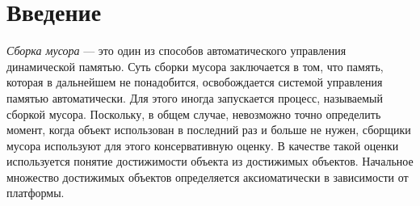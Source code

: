 \documentclass[12pt,a4paper]{article}
\renewcommand\baselinestretch{1.5}
\begin{document}


\tableofcontents    

\newpage
\section*{Введение}
\textit{Сборка мусора} — это один из способов автоматического управления динамической памятью.
Суть сборки мусора заключается в том, что память, которая в дальнейшем не понадобится, освобождается системой управления памятью автоматически. 
Для этого иногда запускается процесс, называемый сборкой  мусора.
Поскольку, в общем случае, невозможно точно определить момент, когда объект использован в последний раз и
больше не нужен, сборщики мусора используют для этого консервативную оценку.
В качестве такой оценки используется понятие достижимости объекта из достижимых объектов. 
Начальное множество достижимых объектов определяется аксиоматически в зависимости от платформы.
\end{document}
